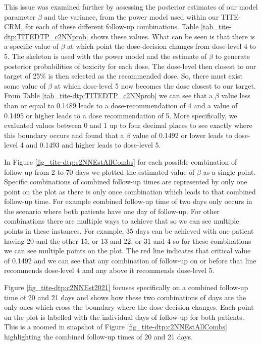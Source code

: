 This issue was examined further by assessing the posterior estimates of our model parameter $\beta$ and the variance, from the power model used within our TITE-CRM, for each of these different follow-up combinations. Table \ref{tab_tite-dtp:TITEDTP_c2NNprob} shows these values. What can be seen is that there is a specific value of $\beta$ at which point the dose-decision changes from dose-level 4 to 5. The skeleton is used with the power model and the estimate of $\beta$ to generate posterior probabilities of toxicity for each dose. The dose-level then closest to our target of 25\% is then selected as the recommended dose. So, there must exist some value of $\beta$ at which dose-level 5 now becomes the dose closest to our target. From Table \ref{tab_tite-dtp:TITEDTP_c2NNprob} we can see that a $\beta$ value less than or equal to 0.1489 leads to a dose-recommendation of 4 and a value of 0.1495 or higher leads to a dose recommendation of 5. More specifically, we evaluated values between 0 and 1 up to four decimal places to see exactly where this boundary occurs and found that a $\beta$ value of 0.1492 or lower leads to dose-level 4 and 0.1493 and higher leads to dose-level 5. 

In Figure \ref{fig_tite-dtp:c2NNEstAllCombs} for each possible combination of follow-up from 2 to 70 days we plotted the estimated value of $\beta$ as a single point. Specific combinations of combined follow-up times are represented by only one point on the plot as there is only once combination which leads to that combined follow-up time. For example combined follow-up time of two days only occurs in the scenario where both patients have one day of follow-up. For other combinations there are multiple ways to achieve that so we can see multiple points in these instances. For example, 35 days can be achieved with one patient having 20 and the other 15, or 13 and 22, or 31 and 4 so for these combinations we can see multiple points on the plot. The red line indicates that critical value of 0.1492 and we can see that any combination of follow-up on or before that line recommends dose-level 4 and any above it recommends dose-level 5. 

Figure \ref{fig_tite-dtp:c2NNEst2021} focuses specifically on a combined follow-up time of 20 and 21 days and shows how these two combinations of days are the only ones which cross the boundary where the dose decision changes. Each point on the plot is labelled with the individual days of follow-up for both patients. This is a zoomed in snapshot of Figure \ref{fig_tite-dtp:c2NNEstAllCombs} highlighting the combined follow-up times of 20 and 21 days. 


